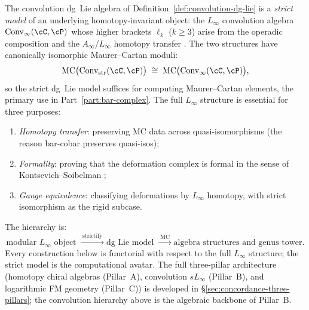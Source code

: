 \begin{remark}
\label{rem:conv-strict-vs-homotopy}
The convolution dg~Lie algebra of Definition~\ref{def:convolution-dg-lie}
is a \emph{strict model} of an underlying homotopy-invariant object: the
$L_\infty$ convolution algebra $\operatorname{Conv}_\infty(\cC, \cP)$
whose higher brackets $\ell_k$ ($k \geq 3$) arise from the operadic
composition and the $A_\infty$/$L_\infty$ homotopy transfer
\cite[\S10.3]{LV12}. The two structures have canonically isomorphic
Maurer--Cartan moduli:
\[
\mathrm{MC}\bigl(\operatorname{Conv}_{\mathrm{str}}(\cC,\cP)\bigr)
\;\cong\;
\mathrm{MC}\bigl(\operatorname{Conv}_\infty(\cC,\cP)\bigr),
\]
so the strict dg~Lie model suffices for computing Maurer--Cartan
elements, the primary use in Part~\ref{part:bar-complex}. The full
$L_\infty$ structure is essential for three purposes:
\begin{enumerate}[label=\textup{(\roman*)}]
\item \emph{Homotopy transfer}: preserving MC data across
 quasi-isomorphisms (the reason bar-cobar preserves quasi-isos);
\item \emph{Formality}: proving that the deformation complex is formal
 in the sense of Kontsevich--Soibelman \cite{KontsevichSoibelman};
\item \emph{Gauge equivalence}: classifying deformations by
 $L_\infty$ homotopy, with strict isomorphism as the rigid subcase.
\end{enumerate}
The hierarchy is:
\[
\text{modular } L_\infty \text{ object}
\;\xrightarrow{\;\text{strictify}\;}
\text{dg Lie model}
\;\xrightarrow{\;\text{MC}\;}
\text{algebra structures and genus tower}.
\]
Every construction below is functorial with respect to the full
$L_\infty$ structure; the strict model is the computational avatar. The full three-pillar architecture (homotopy chiral algebras
(Pillar~A), convolution $sL_\infty$ (Pillar~B), and logarithmic FM
geometry (Pillar~C)) is developed in
\S\ref{sec:concordance-three-pillars}; the convolution
hierarchy above is the algebraic backbone of Pillar~B.
\end{remark}

